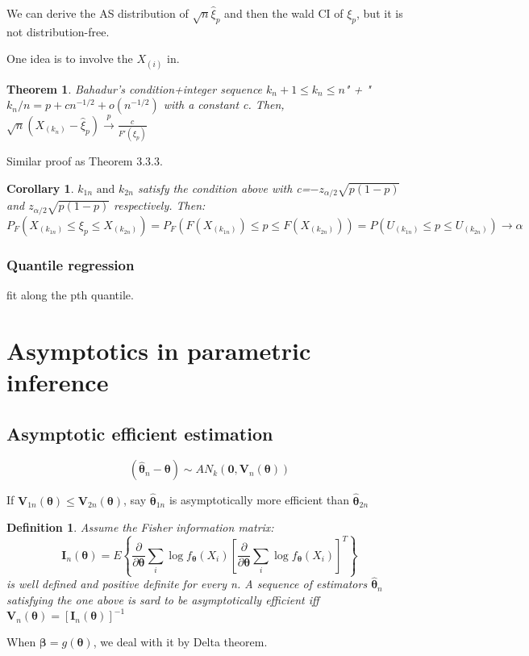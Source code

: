 \documentclass{ctexart}
\newtheorem{theorem}{Theorem}[subsection]
\newtheorem{definition}{Definition}[subsection]
\newtheorem{corollary}{Corollary}[subsection]
\begin{document}
We can derive the AS distribution of \(\sqrt{n}\hat{\xi}_{p}\) and then the wald CI of \(\xi_{p}\), but it is not distribution-free.

One idea is to involve the \(X_{(i)}\) in.

\begin{theorem}
  Bahadur's condition+integer sequence $k_{n}+1\le k_{n}\le n$" + "$k_{n}/n=p+cn^{-1/2}+o(n^{-1/2})$ with a constant c. Then, \(\sqrt{n}(X_{(k_{n})}-\hat{\xi}_{p})\xrightarrow{p}\frac{c}{F'(\xi_{p})}\) 
\end{theorem}
Similar proof as Theorem 3.3.3.
\begin{corollary}
  \(k_{1n} \text{ and }k_{2n}\) satisfy the condition above with c=\(-z_{\alpha/2}\sqrt{p(1-p)}\) and \(z_{\alpha/2}\sqrt{p(1-p)}\) respectively.
  Then: 
  \[
  P_{F}(X_{(k_{1n})}\le \xi_{p}\le X_{(k_{2n})})=P_{F}(F(X_{(k_{1n})})\le p\le F(X_{(k_{2n})}))=P(U_{(k_{1n})}\le p\le U_{(k_{2n})})\to \alpha
  \]  
\end{corollary}
\subsubsection{Quantile regression}
fit along the pth quantile. 
\section{Asymptotics in parametric inference}
\subsection{Asymptotic efficient estimation}
\[
(\hat{\boldsymbol{\theta}}_{n}-\boldsymbol{\theta})\sim AN_{k}(\boldsymbol{0},\boldsymbol{V}_{n}(\boldsymbol{\theta}))
\] 

If \(\boldsymbol{V}_{1n}(\boldsymbol{\theta})\le \boldsymbol{V}_{2n}(\boldsymbol{\theta})\), say \(\hat{\boldsymbol{\theta}}_{1n}\) is asymptotically more efficient than \(\hat{\boldsymbol{\theta}}_{2n}\)  

\begin{definition}
  Assume the Fisher information matrix: 
  \[
  \boldsymbol{I}_{n}(\boldsymbol{\theta})=E\left\{ \frac{\partial }{\partial \boldsymbol{\theta}} \sum_{i}^{} \log f_{\boldsymbol{\theta}}(X_{i})[\frac{\partial }{\partial \boldsymbol{\theta}} \sum_{i}^{} \log f_{\boldsymbol{\theta}}(X_{i})]^{T} \right\}
  \] 
  is well defined and positive definite for every n. A sequence of estimators \(\hat{\boldsymbol{\theta}}_{n}\) satisfying the one above is sard to be asymptotically efficient iff \(\boldsymbol{V}_{n}(\boldsymbol{\theta})=[\boldsymbol{I}_{n}(\boldsymbol{\theta})]^{-1}\)  
\end{definition}
When \(\boldsymbol{\beta}=g(\boldsymbol{\theta})\), we deal with it by Delta theorem.
\end{document}
